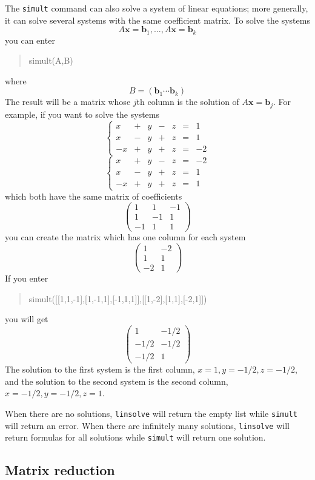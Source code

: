 \documentclass{article}
\newcommand{\xcasin}[1]
{\begin{quote}\ttfamily
#1
\end{quote}}
\newcommand{\xcasout}[1]
{\begin{equation*}
#1
\end{equation*}}
\begin{document}
The \texttt{simult} command can also solve a system of linear
equations; more generally, it can solve several systems with the same
coefficient matrix.  To solve the systems
\[ A\mathbf{x} = \mathbf{b}_1,\dots,A\mathbf{x}=\mathbf{b}_k\]
you can enter
\xcasin{simult(A,B)}
where
\[ B = \left(\mathbf{b}_1 \cdots \mathbf{b}_k\right)\]
The result will be a matrix whose $j$th column is the solution of
$A\mathbf{x}=\mathbf{b}_j$.
For example, if you want to solve the systems
\[
\left\{ \begin{array}{llllllr}
 x &+& y &-& z&=&1\\
 x & -&  y&+& z&=&1 \\
 -x & +&y &+& z&=&-2 
\end{array}\right.
\]
\[
\left\{ \begin{array}{llllllr}
 x &+& y &-& z&=&-2\\
 x & -&  y&+& z&=&1 \\
 -x & +&y &+& z&=&1 
\end{array}\right.
\]
which both have the same matrix of coefficients
\[
\begin{pmatrix}
  1 & 1 & -1\\
  1 & -1 & 1\\
  -1 & 1 & 1
\end{pmatrix}
\]
you can create the matrix which has one column for each system
\[
\begin{pmatrix}
  1 & -2\\
  1 &  1\\
  -2 & 1
\end{pmatrix}
\]
If you enter
\xcasin{simult([[1,1,-1],[1,-1,1],[-1,1,1]],[[1,-2],[1,1],[-2,1]])}
you will get
\xcasout{
\begin{pmatrix}
1 & -1/2\\
-1/2 & -1/2\\
-1/2 & 1
\end{pmatrix}}
The solution to the first system is the first column,
$x=1,y=-1/2,z=-1/2$, and the solution to the second system is the
second column, $x=-1/2,y=-1/2,z=1$.

When there are no solutions, \texttt{linsolve} will return the empty
list while \texttt{simult} will return an error.  When there are
infinitely many solutions, \texttt{linsolve} will return formulas for
all solutions while \texttt{simult} will return one solution.

\subsection{Matrix reduction}
\end{document}
